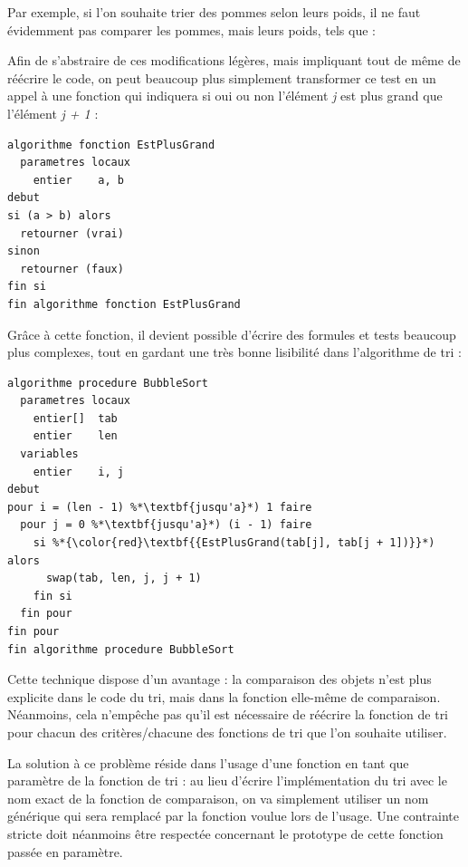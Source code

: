 \documentclass[11pt,a4paper]{article}
\begin{document}
\medskip

Par exemple, si l'on souhaite trier des pommes selon leurs poids, il ne faut évidemment pas comparer les pommes, mais leurs poids, tels que : 

Afin de s'abstraire de ces modifications légères, mais impliquant tout de même de réécrire le code, on peut beaucoup plus simplement transformer ce test en un appel à une fonction qui indiquera si oui ou non l'élément \textit{j} est plus grand que l'élément \textit{j + 1} :

\begin{center}
\begin{lstlisting}[style=algorithmique]
algorithme fonction EstPlusGrand
  parametres locaux
    entier    a, b
debut
si (a > b) alors
  retourner (vrai)
sinon
  retourner (faux)
fin si
fin algorithme fonction EstPlusGrand \end{lstlisting}
\end{center}

Grâce à cette fonction, il devient possible d'écrire des formules et tests beaucoup plus complexes, tout en gardant une très bonne lisibilité dans l'algorithme de tri :

\begin{center}
\begin{lstlisting}[style=algorithmique]
algorithme procedure BubbleSort
  parametres locaux
    entier[]  tab
    entier    len
  variables
    entier    i, j
debut
pour i = (len - 1) %*\textbf{jusqu'a}*) 1 faire
  pour j = 0 %*\textbf{jusqu'a}*) (i - 1) faire
    si %*{\color{red}\textbf{{EstPlusGrand(tab[j], tab[j + 1])}}*) alors
      swap(tab, len, j, j + 1)
    fin si
  fin pour
fin pour
fin algorithme procedure BubbleSort \end{lstlisting}
\end{center}

Cette technique dispose d'un avantage : la comparaison des objets n'est plus explicite dans le code du tri, mais dans la fonction elle-même de comparaison.
Néanmoins, cela n'empêche pas qu'il est nécessaire de réécrire la fonction de tri pour chacun des critères/chacune des fonctions de tri que l'on souhaite utiliser.

\bigskip

La solution à ce problème réside dans l'usage d'une fonction en tant que paramètre de la fonction de tri : au lieu d'écrire l'implémentation du tri avec le nom exact de la fonction de comparaison, on va simplement utiliser un nom générique qui sera remplacé par la fonction voulue lors de l'usage.
Une contrainte stricte doit néanmoins être respectée concernant le prototype de cette fonction passée en paramètre.
\end{document}
